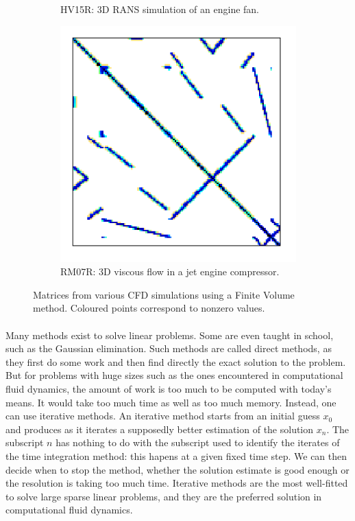 \begin{figure}
\begin{subfigure}[t]{0.3\textwidth}
  				\caption{HV15R: 3D RANS simulation of an engine fan.}
  				\label{fig:sparse.HV15R}
  			\end{subfigure}
  			\hfill
  			\begin{subfigure}[t]{0.3\textwidth}
  				\centering
  				\includegraphics[width=\textwidth]{figures/RM07R.png}
  				\caption{RM07R: 3D viscous flow in a jet engine compressor.}
  				\label{fig:sparse.RM07R}
  			\end{subfigure}
  			\caption{Matrices from various CFD simulations \cite{PacullAubertBuisson2011} using a Finite Volume method. Coloured points correspond to nonzero values.}
  			\label{fig:sparse}
  		\end{figure}

      \paragraph{}
      Many methods exist to solve linear problems.
      Some are even taught in school, such as the Gaussian elimination.
      Such methods are called direct methods, as they first do some work and then find directly the exact solution to the problem.
      But for problems with huge sizes such as the ones encountered in computational fluid dynamics, the amount of work is too much to be computed with today's means.
      It would take too much time as well as too much memory.
      Instead, one can use iterative methods.
      An iterative method starts from an initial guess $x_0$ and produces as it iterates a supposedly better estimation of the solution $x_n$.
      The subscript $n$ has nothing to do with the subscript used to identify the iterates of the time integration method: this hapens at a given fixed time step.
      We can then decide when to stop the method, whether the solution estimate is good enough or the resolution is taking too much time.
      Iterative methods are the most well-fitted to solve large sparse linear problems, and they are the preferred solution in computational fluid dynamics.

